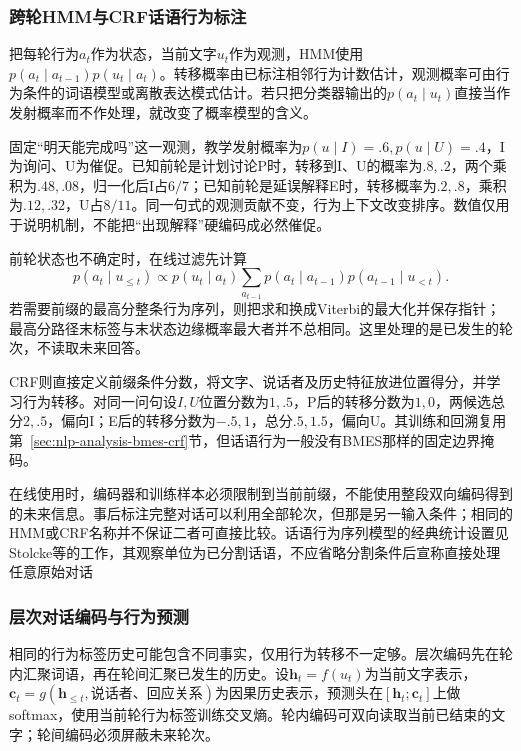 \subsubsection{跨轮HMM与CRF话语行为标注}
\label{sec:nlp-analysis-dialogue-sequence}

把每轮行为$a_t$作为状态，当前文字$u_t$作为观测，HMM使用$p(a_t\mid a_{t-1})p(u_t\mid a_t)$。转移概率由已标注相邻行为计数估计，观测概率可由行为条件的词语模型或离散表达模式估计。若只把分类器输出的$p(a_t\mid u_t)$直接当作发射概率而不作处理，就改变了概率模型的含义。

固定“明天能完成吗”这一观测，教学发射概率为$p(u\mid I)=.6,p(u\mid U)=.4$，I为询问、U为催促。已知前轮是计划讨论P时，转移到I、U的概率为$.8,.2$，两个乘积为$.48,.08$，归一化后I占$6/7$；已知前轮是延误解释E时，转移概率为$.2,.8$，乘积为$.12,.32$，U占$8/11$。同一句式的观测贡献不变，行为上下文改变排序。数值仅用于说明机制，不能把“出现解释”硬编码成必然催促。

前轮状态也不确定时，在线过滤先计算
\[
 p(a_t\mid u_{\leq t})\propto
 p(u_t\mid a_t)\sum_{a_{t-1}}
 p(a_t\mid a_{t-1})p(a_{t-1}\mid u_{<t}).
\]
若需要前缀的最高分整条行为序列，则把求和换成Viterbi的最大化并保存指针；最高分路径末标签与末状态边缘概率最大者并不总相同。这里处理的是已发生的轮次，不读取未来回答。

CRF则直接定义前缀条件分数，将文字、说话者及历史特征放进位置得分，并学习行为转移。对同一问句设$I,U$位置分数为$1,.5$，P后的转移分数为$1,0$，两候选总分$2,.5$，偏向I；E后的转移分数为$-.5,1$，总分$.5,1.5$，偏向U。其训练和回溯复用第~\ref{sec:nlp-analysis-bmes-crf}节，但话语行为一般没有BMES那样的固定边界掩码。

在线使用时，编码器和训练样本必须限制到当前前缀，不能使用整段双向编码得到的未来信息。事后标注完整对话可以利用全部轮次，但那是另一输入条件；相同的HMM或CRF名称并不保证二者可直接比较。话语行为序列模型的经典统计设置见Stolcke等的工作，其观察单位为已分割话语，不应省略分割条件后宣称直接处理任意原始对话

\subsubsection{层次对话编码与行为预测}
\label{sec:nlp-analysis-dialogue-hierarchical}

相同的行为标签历史可能包含不同事实，仅用行为转移不一定够。层次编码先在轮内汇聚词语，再在轮间汇聚已发生的历史。设$\bm h_t=f(u_t)$为当前文字表示，$\bm c_t=g(\bm h_{\leq t},\text{说话者、回应关系})$为因果历史表示，预测头在$[\bm h_t;\bm c_t]$上做softmax，使用当前轮行为标签训练交叉熵。轮内编码可双向读取当前已结束的文字；轮间编码必须屏蔽未来轮次。

